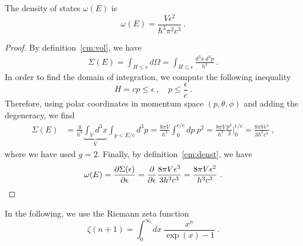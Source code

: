     The density of states $\omega(E)$ is 
    \begin{equation*}
        \omega(E) = \frac{V \epsilon^2}{\hbar^3 \pi^2 c^3} ~.
    \end{equation*}
    \begin{proof}
        By definition~\eqref{cm:vol}, we have
        \begin{equation*}
        \begin{aligned}
            \Sigma (E) = \int_{H \leq \epsilon} d\Omega = \int_{H \leq \epsilon} \frac{d^3 x ~ d^3 p}{h^3} ~.
        \end{aligned}
        \end{equation*}
        In order to find the domain of integration, we compute the following inequality
        \begin{equation*}
            H = c p \leq \epsilon ~, \quad p \leq \frac{\epsilon}{c} ~.
        \end{equation*}
        Therefore, using polar coordinates in momentum space $(p, \theta, \phi)$ and adding the degeneracy, we find
        \begin{equation*}
        \begin{aligned}
            \Sigma (E) & = \frac{g}{h^3} \underbrace{\int_V d^3 x}_V \int_{p < E/c} d^3 p = \frac{8 \pi V}{h^3} \int_0^{\epsilon/c} dp ~p^2 = \frac{8 \pi V}{h^3} \frac{p^3}{3} \Big \vert_0^{\epsilon/c} = \frac{8 \pi V \epsilon^3}{3 h^3 c^3}~,
        \end{aligned}
        \end{equation*}
        where we have used $g = 2$. Finally, by definition~\eqref{cm:denst}, we have
        \begin{equation*}
            \omega (E) = \frac{\partial\Sigma (\epsilon)}{\partial\epsilon} = \frac{\partial}{\partial\epsilon} \frac{8 \pi V \epsilon^3}{3 h^3 c^3} = \frac{8 \pi V \epsilon^2}{h^3 c^3} ~.
        \end{equation*}
    \end{proof}

    In the following, we use the Riemann zeta function 
    \begin{equation}
        \zeta (n+1) = \int_0^\infty dx ~ \frac{x^n}{\exp(x) - 1} ~.
    \end{equation}

